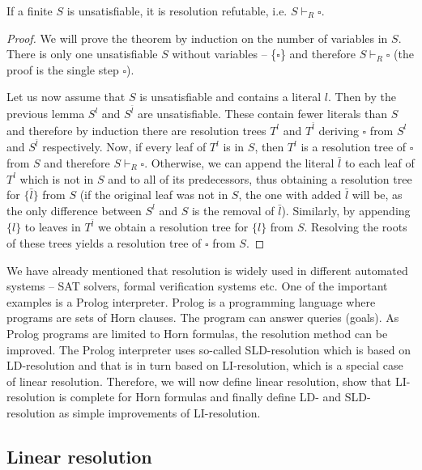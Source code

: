 \begin{theorem}
If a finite $S$ is unsatisfiable, it is resolution refutable, i.e. $S \vdash_R \square$.
\end{theorem}
\begin{proof}
We will prove the theorem by induction on the number of variables in $S$. There is only one unsatisfiable $S$ without variables -- \{$\square$\} and therefore $S \vdash_R \square$ (the proof is the single step $\square$).

Let us now assume that $S$ is unsatisfiable and contains a literal $l$. Then by the previous lemma $S^l$ and $S^{\bar{l}}$ are unsatisfiable. These contain fewer literals than $S$ and therefore by induction there are resolution trees $T^l$ and $T^{\bar{l}}$ deriving $\square$ from $S^l$ and $S^{\bar{l}}$ respectively. Now, if every leaf of $T^l$ is in $S$, then $T^l$ is a resolution tree of $\square$ from $S$ and therefore $S \vdash_R \square$. Otherwise, we can append the literal $\bar{l}$ to each leaf of $T^l$ which is not in $S$ and to all of its predecessors, thus obtaining a resolution tree for $\{\bar{l}\}$ from $S$ (if the original leaf was not in $S$, the one with added $\bar{l}$ will be, as the only difference between $S^l$ and $S$ is the removal of $\bar{l}$). Similarly, by appending $\{l\}$ to leaves in $T^{\bar{l}}$ we obtain a resolution tree for $\{l\}$ from $S$. Resolving the roots of these trees yields a resolution tree of $\square$ from $S$.
\end{proof}

We have already mentioned that resolution is widely used in different automated systems -- SAT solvers, formal verification systems etc. One of the important examples is a Prolog interpreter. Prolog is a programming language where programs are sets of Horn clauses. The program can answer queries (goals). As Prolog programs are limited to Horn formulas, the resolution method can be improved. The Prolog interpreter uses so-called SLD-resolution which is based on LD-resolution and that is in turn based on LI-resolution, which is a special case of linear resolution. Therefore, we will now define linear resolution, show that LI-resolution is complete for Horn formulas and finally define LD- and SLD-resolution as simple improvements of LI-resolution.

\subsection{Linear resolution}

